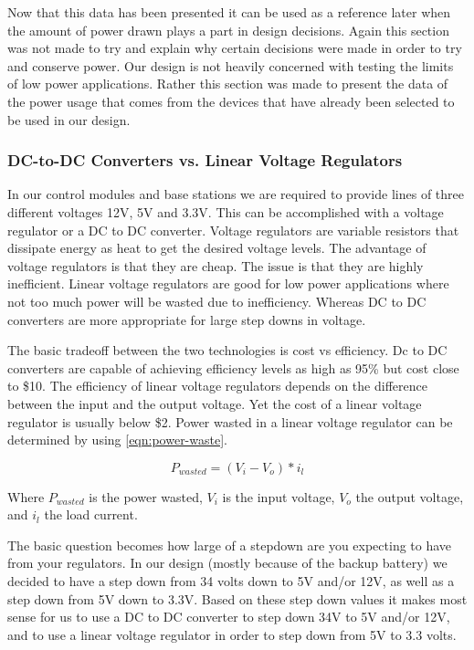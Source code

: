 Now that this data has been presented it can be used as a reference later when
the amount of power drawn plays a part in design decisions. Again this section
was not made to try and explain why certain decisions were made in order to try
and conserve power. Our design is not heavily concerned with testing the limits
of low power applications. Rather this section was made to present the data of
the power usage that comes from the devices that have already been selected to
be used in our design.


\subsubsection{DC-to-DC Converters vs. Linear Voltage Regulators}
In our control modules and base stations we are required to provide lines of
three different voltages 12V, 5V and 3.3V. This can be accomplished with a
voltage regulator or a DC to DC converter. Voltage regulators are variable
resistors that dissipate energy as heat to get the desired voltage levels. The
advantage of voltage regulators is that they are cheap. The issue is that they
are highly inefficient. Linear voltage regulators are good for low power
applications where not too much power will be wasted due to inefficiency.
Whereas DC to DC converters are more appropriate for large step downs in
voltage.

The basic tradeoff between the two technologies is cost vs efficiency. Dc to DC
converters are capable of achieving efficiency levels as high as 95\% but cost
close to \$10. The efficiency of linear voltage regulators depends on the
difference between the input and the output voltage. Yet the cost of a linear
voltage regulator is usually below \$2. Power wasted in a linear voltage
regulator can be determined by using \autoref{eqn:power-waste}.

\begin{equation}
P_{wasted} = (V_i - V_o) * i_l
\label{eqn:power-waste}
\end{equation}

Where $P_{wasted}$ is the power wasted, $V_i$ is the input voltage, $V_o$ the
output voltage, and $i_l$ the load current.

The basic question becomes how large of a stepdown are you expecting to have
from your regulators. In our design (mostly because of the backup battery) we
decided to have a step down from 34 volts down to 5V and/or 12V, as well as a
step down from 5V down to 3.3V. Based on these step down values it makes most
sense for us to use a DC to DC converter to step down 34V to 5V and/or 12V, and
to use a linear voltage regulator in order to step down from 5V to 3.3 volts.

